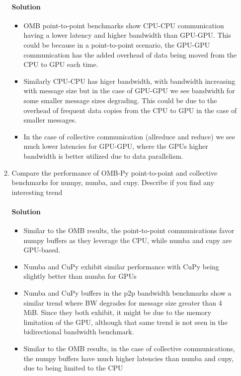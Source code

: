 \documentclass[12pt]{article}
\begin{document}
\begin{enumerate}
\begin{enumerate}
    \paragraph[short]{Solution} 
    
    \begin{itemize}
        \item OMB point-to-point benchmarks show CPU-CPU communication 
            having a lower latency and higher bandwidth than GPU-GPU. This could be 
            because in a point-to-point scenario, the GPU-GPU communication has the 
            added overhead of data being moved from the CPU to GPU each time.
        \item Similarly CPU-CPU has higer bandwidth, with bandwidth increasing with message size 
            but in the case of GPU-GPU we see bandwidth for some smaller message sizes degrading. This could 
            be due to the overhead of frequent data copies from the CPU to GPU in the case of smaller messages.
        \item In the case of collective communication (allreduce and reduce) we see much lower 
            latencies for GPU-GPU, where the GPUs higher bandwidth is better utilized due to data parallelism.
    \end{itemize}

    \item Compare the performance of OMB-Py point-to-point and collective 
            benchmarks for numpy, numba, and cupy. Describe if you find any 
            interesting trend
    
    \paragraph[short]{Solution} 

    \begin{itemize}
        \item Similar to the OMB results, the point-to-point communications favor numpy buffers
        as they leverage the CPU, while numba and cupy are GPU-based.
        \item Numba and CuPy exhibit similar performance with CuPy being slightly better than numba for GPUs
        \item Numba and CuPy buffers in the p2p bandwidth benchmarks show a similar trend where 
            BW degrades for message size greater than 4 MiB. Since they both exhibit, it might be 
            due to the memory limitation of the GPU, although that same trend is not 
            seen in the bidirectional bandwidth benchmark.
        \item Similar to the OMB results, in the case of collective communications, the numpy buffers 
        have much higher latencies than numba and cupy, due to being limited to the CPU
    \end{itemize}


\end{enumerate}
\end{enumerate}
\end{document}
